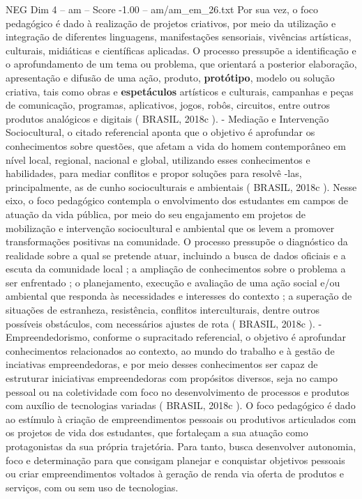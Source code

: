 \begin{textsample}{NEG Dim 4 – am – Score -1.00 – am/am\_em\_26.txt}
Por sua vez, o foco pedagógico é dado à realização de projetos criativos, por meio da utilização e integração de diferentes linguagens, manifestações sensoriais, vivências artísticas, culturais, midiáticas e científicas aplicadas.
O processo pressupõe a identificação e o aprofundamento de um tema ou problema, que orientará a posterior elaboração, apresentação e difusão de uma ação, produto, \textbf{protótipo}, modelo ou solução criativa, tais como obras e \textbf{espetáculos} artísticos e culturais, campanhas e peças de comunicação, programas, aplicativos, jogos, robôs, circuitos, entre outros produtos analógicos e digitais ( BRASIL, 2018c ). - Mediação e Intervenção Sociocultural, o citado referencial aponta que o objetivo é aprofundar os conhecimentos sobre questões, que afetam a vida do homem contemporâneo em nível local, regional, nacional e global, utilizando esses conhecimentos e habilidades, para mediar conflitos e propor soluções para resolvê -las, principalmente, as de cunho socioculturais e ambientais ( BRASIL, 2018c ).
Nesse eixo, o foco pedagógico contempla o envolvimento dos estudantes em campos de atuação da vida pública, por meio do seu engajamento em projetos de mobilização e intervenção sociocultural e ambiental que os levem a promover transformações positivas na comunidade.
O processo pressupõe o diagnóstico da realidade sobre a qual se pretende atuar, incluindo a busca de dados oficiais e a escuta da comunidade local ; a ampliação de conhecimentos sobre o problema a ser enfrentado ; o planejamento, execução e avaliação de uma ação social e/ou ambiental que responda às necessidades e interesses do contexto ; a superação de situações de estranheza, resistência, conflitos interculturais, dentre outros possíveis obstáculos, com necessários ajustes de rota ( BRASIL, 2018c ). - Empreendedorismo, conforme o supracitado referencial, o objetivo é aprofundar conhecimentos relacionados ao contexto, ao mundo do trabalho e à gestão de inciativas empreendedoras, e por meio desses conhecimentos ser capaz de estruturar iniciativas empreendedoras com propósitos diversos, seja no campo pessoal ou na coletividade com foco no desenvolvimento de processos e produtos com auxílio de tecnologias variadas ( BRASIL, 2018c ).
O foco pedagógico é dado ao estímulo à criação de empreendimentos pessoais ou produtivos articulados com os projetos de vida dos estudantes, que fortaleçam a sua atuação como protagonistas da sua própria trajetória.
Para tanto, busca desenvolver autonomia, foco e determinação para que consigam planejar e conquistar objetivos pessoais ou criar empreendimentos voltados à geração de renda via oferta de produtos e serviços, com ou sem uso de tecnologias.

\end{textsample}
